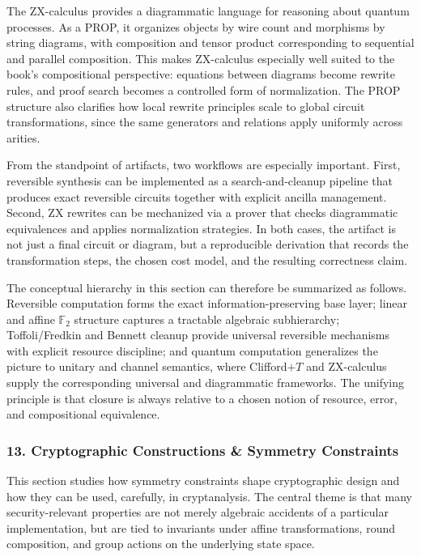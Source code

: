 \documentclass[11pt]{article}
\begin{document}
The ZX-calculus provides a diagrammatic language for reasoning about quantum processes. As a PROP, it organizes objects by wire count and morphisms by string diagrams, with composition and tensor product corresponding to sequential and parallel composition. This makes ZX-calculus especially well suited to the book's compositional perspective: equations between diagrams become rewrite rules, and proof search becomes a controlled form of normalization. The PROP structure also clarifies how local rewrite principles scale to global circuit transformations, since the same generators and relations apply uniformly across arities.

From the standpoint of artifacts, two workflows are especially important. First, reversible synthesis can be implemented as a search-and-cleanup pipeline that produces exact reversible circuits together with explicit ancilla management. Second, ZX rewrites can be mechanized via a prover that checks diagrammatic equivalences and applies normalization strategies. In both cases, the artifact is not just a final circuit or diagram, but a reproducible derivation that records the transformation steps, the chosen cost model, and the resulting correctness claim.

The conceptual hierarchy in this section can therefore be summarized as follows. Reversible computation forms the exact information-preserving base layer; linear and affine \(\mathbb{F}_2\) structure captures a tractable algebraic subhierarchy; Toffoli/Fredkin and Bennett cleanup provide universal reversible mechanisms with explicit resource discipline; and quantum computation generalizes the picture to unitary and channel semantics, where Clifford\(+T\) and ZX-calculus supply the corresponding universal and diagrammatic frameworks. The unifying principle is that closure is always relative to a chosen notion of resource, error, and compositional equivalence.



\subsubsection{13. Cryptographic Constructions \& Symmetry Constraints}


This section studies how symmetry constraints shape cryptographic design and how they can be used, carefully, in cryptanalysis. The central theme is that many security-relevant properties are not merely algebraic accidents of a particular implementation, but are tied to invariants under affine transformations, round composition, and group actions on the underlying state space.
\end{document}

